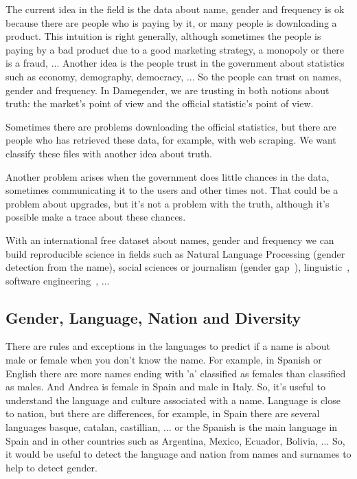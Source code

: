 \documentclass[a4paper]{article}
\begin{document}
The current idea in the field is the data about name, gender and
frequency is ok because there are people who is paying by it, or many
people is downloading a product. This intuition is right generally,
although sometimes the people is paying by a bad product due to a good
marketing strategy, a monopoly or there is a fraud, ... Another idea
is the people trust in the government about statistics such as economy,
demography, democracy, ... So the people can trust on names, gender
and frequency. In Damegender, we are trusting in both notions about
truth: the market's point of view and the official statistic's
point of view.

Sometimes there are problems downloading the official statistics, but
there are people who has retrieved these data, for example, with
web scraping. We want classify these files with another idea about
truth.

Another problem arises when the government does little chances in the
data, sometimes communicating it to the users and other times
not. That could be a problem about upgrades, but it's not a problem
with the truth, although it's possible make a trace about these
chances.

With an international free dataset about names, gender and frequency
we can build reproducible science in fields such as Natural Language
Processing (gender detection from the name), social sciences or
journalism (gender
gap~\cite{holman2018gender,mislove2011understanding,niemi2017gendered,de2014genero}),
linguistic~\cite{lawson2005russian,krueger1962mongolian,van2020gender,agyekum2006sociolinguistic,fraser1987lexicon},
software engineering~\cite{vasilescu2012gender}, ...

\subsection{Gender, Language, Nation and Diversity}
\label{sec:diversity}

There are rules and exceptions in the languages to predict if a name
is about male or female when you don't know the name. For example, in
Spanish or English there are more names ending with 'a' classified as
females than classified as males. And Andrea is female in Spain and
male in Italy. So, it's useful to understand the language and culture
associated with a name. Language is close to nation, but there are
differences, for example, in Spain there are several languages basque,
catalan, castillian, ... or the Spanish is the main language in Spain
and in other countries such as Argentina, Mexico, Ecuador, Bolivia,
... So, it would be useful to detect the language and nation from
names and surnames to help to detect gender.
\end{document}
